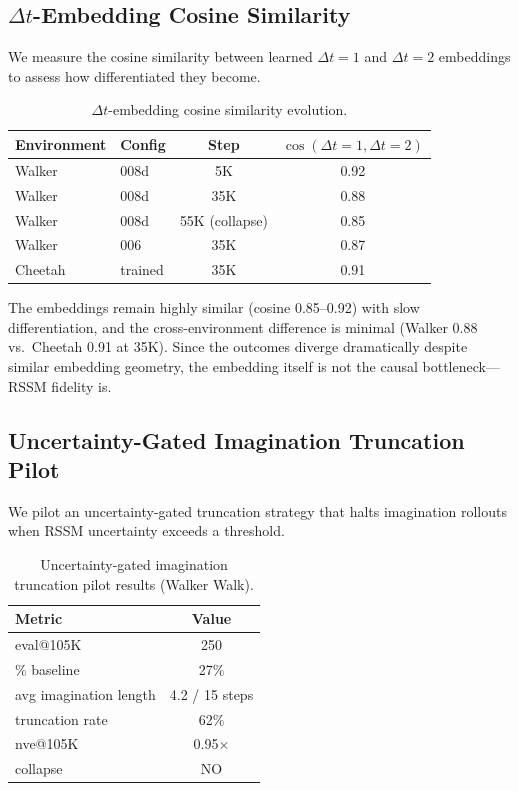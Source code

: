 \documentclass[10pt,letterpaper]{article}
\begin{document}
\subsection{$\Delta t$-Embedding Cosine Similarity}
\label{sec:cosine}

We measure the cosine similarity between learned $\Delta t{=}1$ and $\Delta t{=}2$ embeddings to assess how differentiated they become.

\begin{table}[h]
\centering
\caption{$\Delta t$-embedding cosine similarity evolution.}
\label{tab:cosine}
\begin{tabular}{llcc}
\toprule
Environment & Config & Step & $\cos(\Delta t{=}1, \Delta t{=}2)$ \\
\midrule
Walker & 008d & 5K & 0.92 \\
Walker & 008d & 35K & 0.88 \\
Walker & 008d & 55K (collapse) & 0.85 \\
Walker & 006 & 35K & 0.87 \\
Cheetah & trained & 35K & 0.91 \\
\bottomrule
\end{tabular}
\end{table}

The embeddings remain highly similar (cosine 0.85--0.92) with slow differentiation, and the cross-environment difference is minimal (Walker 0.88 vs.\ Cheetah 0.91 at 35K). Since the outcomes diverge dramatically despite similar embedding geometry, the embedding itself is not the causal bottleneck---RSSM fidelity is.

\subsection{Uncertainty-Gated Imagination Truncation Pilot}
\label{sec:truncation}

We pilot an uncertainty-gated truncation strategy that halts imagination rollouts when RSSM uncertainty exceeds a threshold.

\begin{table}[h]
\centering
\caption{Uncertainty-gated imagination truncation pilot results (Walker Walk).}
\label{tab:truncation}
\begin{tabular}{lc}
\toprule
Metric & Value \\
\midrule
eval@105K & 250 \\
\% baseline & 27\% \\
avg imagination length & 4.2 / 15 steps \\
truncation rate & 62\% \\
nve@105K & 0.95$\times$ \\
collapse & NO \\
\bottomrule
\end{tabular}
\end{table}
\end{document}
